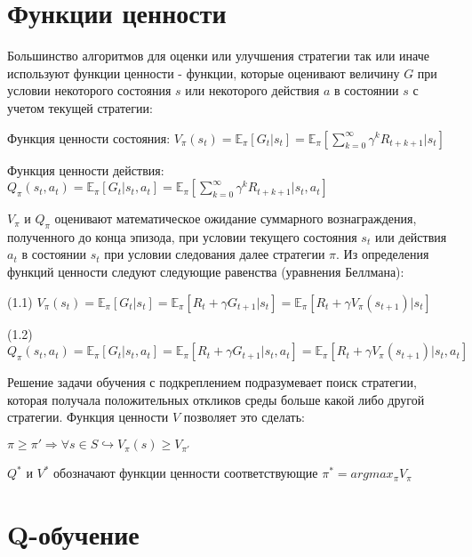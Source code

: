 \documentclass{mipt-thesis-bs}
\begin{document}


\section{Функции ценности}

Большинство алгоритмов для оценки или улучшения стратегии так или иначе используют функции ценности - функции, которые оценивают величину $G$ при условии некоторого состояния $s$ или некоторого действия $a$ в состоянии $s$ с учетом текущей стратегии:

Функция ценности состояния: $V_{\pi}(s_t) = \mathbb{E}_{\pi}[G_{t} | s_t]=\mathbb{E}_{\pi}[\sum_{k=0}^{\infty} \gamma^{k} R_{t+k+1} | s_t]$ 
 
Функция ценности действия: $Q_{\pi}(s_t, a_t) = \mathbb{E}_{\pi}[G_{t} | s_{t}, a_{t}]=\mathbb{E}_{\pi}[\sum_{k=0}^{\infty} \gamma^{k} R_{t+k+1} | s_{t}, a_{t}]$

$V_\pi$ и $Q_\pi$ оценивают математическое ожидание суммарного вознаграждения, полученного до конца эпизода, при условии текущего состояния $s_t$ или действия $a_t$ в состоянии $s_t$ при условии следования далее стратегии $\pi$. Из определения функций ценности следуют следующие равенства (уравнения Беллмана):
\begin{center}
(1.1) $V_{\pi}(s_t) = \mathbb{E}_{\pi}[G_t | s_t]=\mathbb{E}_{\pi}[R_{t} + \gamma G_{t+1}| s_t] = \mathbb{E}_{\pi}[R_{t} + \gamma V_{\pi}(s_{t+1})| s_t]$ 

(1.2) $Q_{\pi}(s_t, a_t) = \mathbb{E}_{\pi}[G_{t} | s_t, a_t]=\mathbb{E}_{\pi}[R_{t} + \gamma G_{t+1}| s_t, a_t] = \mathbb{E}_{\pi}[R_{t} + \gamma V_{\pi}(s_{t+1})| s_t, a_t]$
\end{center}

Решение задачи обучения с подкреплением подразумевает поиск стратегии, которая получала положительных откликов среды больше какой либо другой стратегии. Функция ценности $V$ позволяет это сделать:

\begin{center}
    $\pi \geq \pi' \Rightarrow \forall s \in S \hookrightarrow V_\pi(s) \geq V_{\pi'}$
\end{center}

$Q^*$ и $V^*$ обозначают функции ценности соответствующие $\pi^*= argmax_{\pi} V_\pi$

\section{Q-обучение}
\end{document}
